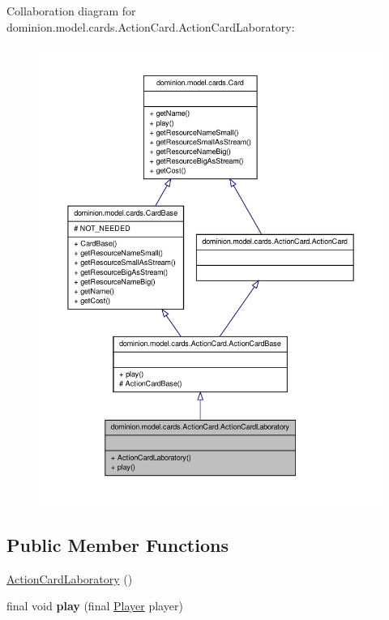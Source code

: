 \-Collaboration diagram for dominion.\-model.\-cards.\-Action\-Card.\-Action\-Card\-Laboratory\-:
\nopagebreak
\begin{figure}[H]
\begin{center}
\leavevmode
\includegraphics[width=350pt]{classdominion_1_1model_1_1cards_1_1ActionCard_1_1ActionCardLaboratory__coll__graph}
\end{center}
\end{figure}
\subsection*{\-Public \-Member \-Functions}
\begin{DoxyCompactItemize}
\item 
\hyperlink{classdominion_1_1model_1_1cards_1_1ActionCard_1_1ActionCardLaboratory_ad2fe44e89001f79dd407029101647c61}{\-Action\-Card\-Laboratory} ()
\item 
\hypertarget{classdominion_1_1model_1_1cards_1_1ActionCard_1_1ActionCardLaboratory_acd3b10ff6e1d9e3e2eaf90574cd9d8b5}{final void {\bfseries play} (final \hyperlink{interfacedominion_1_1model_1_1Player}{\-Player} player)}\label{classdominion_1_1model_1_1cards_1_1ActionCard_1_1ActionCardLaboratory_acd3b10ff6e1d9e3e2eaf90574cd9d8b5}

\end{DoxyCompactItemize}


